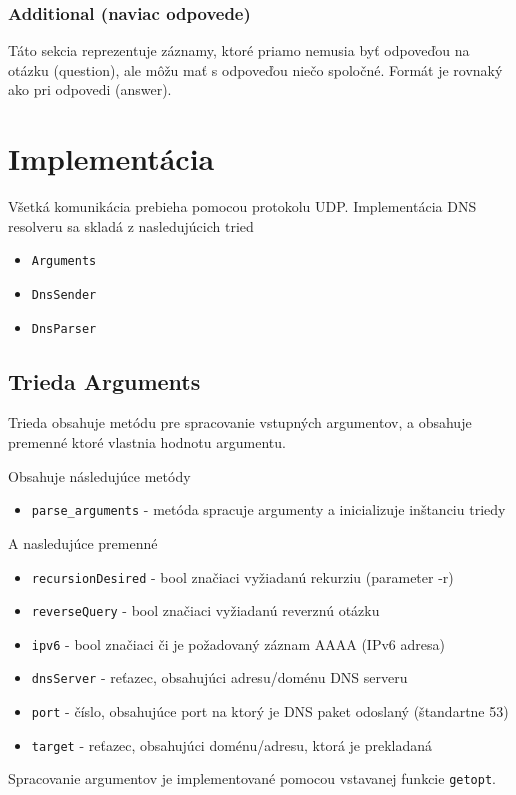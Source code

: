 \documentclass[titlepage]{article}
\begin{document}
\subsubsection{Additional (naviac odpovede)}
Táto sekcia reprezentuje záznamy, ktoré priamo nemusia byť odpoveďou na otázku (question),
ale môžu mať s odpoveďou niečo spoločné. Formát je rovnaký ako pri odpovedi (answer).

\newpage
\section{Implementácia}
Všetká komunikácia prebieha pomocou protokolu UDP.
Implementácia DNS resolveru sa skladá z nasledujúcich tried
\begin{itemize}
    \item \verb|Arguments|
    \item \verb|DnsSender|
    \item \verb|DnsParser|
\end{itemize}

\subsection{Trieda Arguments}
Trieda obsahuje metódu pre spracovanie vstupných argumentov, a obsahuje premenné
ktoré vlastnia hodnotu argumentu.

Obsahuje následujúce metódy
\begin{itemize}
    \item \verb|parse_arguments| - metóda spracuje argumenty a inicializuje inštanciu triedy
\end{itemize}

A nasledujúce premenné
\begin{itemize}
    \item \verb|recursionDesired| - bool značiaci vyžiadanú rekurziu (parameter -r)
    \item \verb|reverseQuery| - bool značiaci vyžiadanú reverznú otázku
    \item \verb|ipv6| - bool značiaci či je požadovaný záznam AAAA (IPv6 adresa)
    \item \verb|dnsServer| - reťazec, obsahujúci adresu/doménu DNS serveru
    \item \verb|port| - číslo, obsahujúce port na ktorý je DNS paket odoslaný (štandartne 53)
    \item \verb|target| - reťazec, obsahujúci doménu/adresu, ktorá je prekladaná
\end{itemize}
Spracovanie argumentov je implementované pomocou vstavanej funkcie \verb|getopt|.
\end{document}
